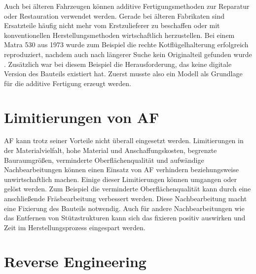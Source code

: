 Auch bei älteren Fahrzeugen können additive Fertigungsmethoden zur 
Reparatur oder Restauration verwendet werden.
Gerade bei älteren Fabrikaten sind Ersatzteile häufig nicht mehr vom 
Erstzulieferer zu beschaffen oder mit konventionellen Herstellungsmethoden
wirtschaftlich herzustellen.
Bei einem Matra 530 aus 1973 wurde zum Beispiel die rechte 
Kotflügelhalterung erfolgreich reproduziert, nachdem auch nach längerer Suche
kein Originalteil gefunden wurde \cite{AMExpo365.03.06.2024}. Zusätzlich war
bei diesem Beispiel die Herausforderung, das keine digitale Version des
Bauteils existiert hat. Zuerst musste also ein Modell als Grundlage für die
additive Fertigung erzeugt werden.

\section{Limitierungen von AF}

AF kann trotz seiner Vorteile nicht überall eingesetzt werden. Limitierungen 
in der Materialvielfalt, hohe Material und Anschaffungskosten, begrenzte
Bauraumgrößen, verminderte Oberflächenqualität und aufwändige Nachbearbeitungen
können einen Einsatz von AF verhindern beziehungsweise unwirtschaftlich machen. 
\cite{inproceedings}
Einige dieser Limitierungen können umgangen oder gelöst werden. Zum Beispiel die
verminderte Oberflächenqualität kann durch eine anschließende Fräsbearbeitung
verbessert werden. 
Diese Nachbearbeitung macht eine Fixierung des Bauteils notwendig. Auch für andere
Nachbearbeitungen wie das Entfernen von Stützstrukturen kann sich das fixieren 
positiv auswirken und Zeit im Herstellungsprozess eingespart werden.

\section{Reverse Engineering}

